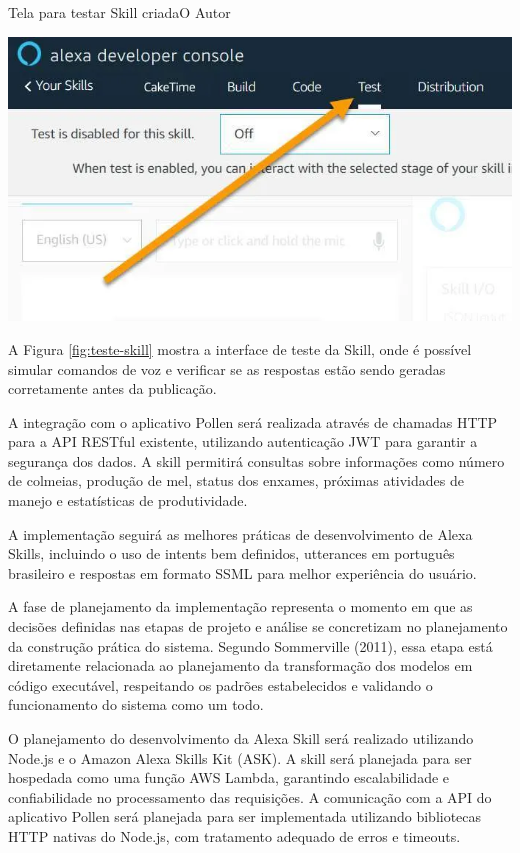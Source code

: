 \begin{figura}{Tela para testar Skill criada}{O Autor}
    \begin{flushleft}
        \label{fig:teste-skill}
        \includegraphics[width=0.85\linewidth]{resources/floats/ilustracoes/tela_para_testar_skill_criada.png}
    \end{flushleft}
\end{figura}

A Figura \ref{fig:teste-skill} mostra a interface de teste da Skill, onde é possível simular comandos de voz e verificar se as respostas estão sendo geradas corretamente antes da publicação.

A integração com o aplicativo Pollen será realizada através de chamadas HTTP para a API RESTful existente, utilizando autenticação JWT para garantir a segurança dos dados. 
A skill permitirá consultas sobre informações como número de colmeias, produção de mel, status dos enxames, próximas atividades de manejo e estatísticas de produtividade.

A implementação seguirá as melhores práticas de desenvolvimento de Alexa Skills, incluindo o uso de intents bem definidos, utterances em português brasileiro e respostas em formato SSML para melhor experiência do usuário.

\label{sssec:implementação}


A fase de planejamento da implementação representa o momento em que as decisões definidas nas etapas de projeto e análise se concretizam no planejamento da construção prática do sistema. 
Segundo Sommerville (2011), essa etapa está diretamente relacionada ao planejamento da transformação dos modelos em código executável, respeitando os padrões estabelecidos e validando o funcionamento do sistema como um todo. 

O planejamento do desenvolvimento da Alexa Skill será realizado utilizando Node.js e o Amazon Alexa Skills Kit (ASK). 
A skill será planejada para ser hospedada como uma função AWS Lambda, garantindo escalabilidade e confiabilidade no processamento das requisições. 
A comunicação com a API do aplicativo Pollen será planejada para ser implementada utilizando bibliotecas HTTP nativas do Node.js, com tratamento adequado de erros e timeouts.

